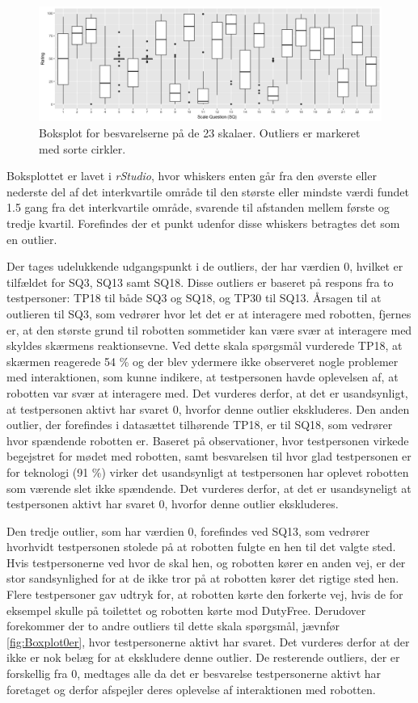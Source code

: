 %
\begin{figure}[H]
\centering
\includegraphics[width = \textwidth]{Figure/DatabehandlingSkalaer/Boksplot0er} 
\caption{Boksplot for besvarelserne på de 23 skalaer. Outliers er markeret med sorte cirkler.}
\label{fig:Boxplot0er}
\end{figure}
\noindent
%
Boksplottet er lavet i \textit{rStudio}, hvor whiskers enten går fra den øverste eller nederste del af det interkvartile område til den største eller mindste værdi fundet 1.5 gang fra det interkvartile område, svarende til afstanden mellem første og tredje kvartil. Forefindes der et punkt udenfor disse whiskers betragtes det som en outlier.

Der tages udelukkende udgangspunkt i de outliers, der har værdien 0, hvilket er tilfældet for SQ3, SQ13 samt SQ18. Disse outliers er baseret på respons fra to testpersoner: TP18 til både SQ3 og SQ18, og TP30 til SQ13. Årsagen til at outlieren til SQ3, som vedrører hvor let det er at interagere med robotten, fjernes er, at den største grund til robotten sommetider kan være svær at interagere med skyldes skærmens reaktionsevne. Ved dette skala spørgsmål vurderede TP18, at skærmen reagerede 54 \% og der blev ydermere ikke observeret nogle problemer med interaktionen, som kunne indikere, at testpersonen havde oplevelsen af, at robotten var svær at interagere med. Det vurderes derfor, at det er usandsynligt, at testpersonen aktivt har svaret 0, hvorfor denne outlier ekskluderes. Den anden outlier, der forefindes i datasættet tilhørende TP18, er til SQ18, som vedrører hvor spændende robotten er. Baseret på observationer, hvor testpersonen virkede begejstret for mødet med robotten, samt besvarelsen til hvor glad testpersonen er for teknologi (91 \%) virker det usandsynligt at testpersonen har oplevet robotten som værende slet ikke spændende. Det vurderes derfor, at det er usandsyneligt at testpersonen aktivt har svaret 0, hvorfor denne outlier ekskluderes.

Den tredje outlier, som har værdien 0, forefindes ved SQ13, som vedrører hvorhvidt testpersonen stolede på at robotten fulgte en hen til det valgte sted. Hvis testpersonerne ved hvor de skal hen, og robotten kører en anden vej, er der stor sandsynlighed for at de ikke tror på at robotten kører det rigtige sted hen. Flere testpersoner gav udtryk for, at robotten kørte den forkerte vej, hvis de for eksempel skulle på toilettet og robotten kørte mod DutyFree. Derudover forekommer der to andre outliers til dette skala spørgsmål, jævnfør \autoref{fig:Boxplot0er}, hvor testpersonerne aktivt har svaret. Det vurderes derfor at der ikke er nok belæg for at ekskludere denne outlier. \blankline
%
De resterende outliers, der er forskellig fra 0, medtages alle da det er besvarelse testpersonerne aktivt har foretaget og derfor afspejler deres oplevelse af interaktionen med robotten.  

